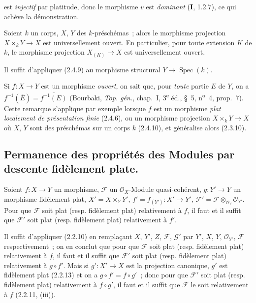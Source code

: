 est \emph{injectif} par platitude, donc le morphisme $v$ est \emph{dominant}
(\textbf{I}, 1.2.7), ce qui achève la démonstration.

\begin{corollary}[2.4.10]
\label{IV.2.4.10-fr}
Soient $k$ un corps, $X$, $Y$ des $k$-préschémas~; alors le morphisme
projection $X\times_k Y\to X$ est universellement ouvert. En particulier,
pour toute extension $K$ de $k$, le morphisme projection $X_{(K)}\to X$ est
universellement ouvert.
\end{corollary}

Il suffit d'appliquer (2.4.9) au morphisme structural
$Y\to\operatorname{Spec}(k)$.

\begin{remark}[2.4.11]
\label{IV.2.4.11-fr}
Si $f:X\to Y$ est un morphisme \emph{ouvert}, on sait que, pour \emph{toute} partie
$E$ de $Y$, on a
$f^{-1}(\overline E)=\overline{f^{-1}(E)}$
(Bourbaki, \emph{Top. gén.}, chap.~I, 3\textsuperscript{e} éd., \S~5,
n\textsuperscript{o}~4, prop.~7). Cette remarque s'applique par exemple
lorsque $f$ est un morphisme \emph{plat localement de présentation finie}
(2.4.6), ou un morphisme projection $X\times_k Y\to X$ où $X$, $Y$ sont des
préschémas sur un corps $k$ (2.4.10), et généralise alors (2.3.10).
\end{remark}

\subsection{Permanence des propriétés des Modules par descente fidèlement plate.}

\begin{proposition}[2.5.1]
\label{IV.2.5.1-fr}
Soient $f:X\to Y$ un morphisme, $\mathscr F$ un $\mathcal O_X$-Module
quasi-cohérent, $g:Y'\to Y$ un morphisme fidèlement plat,
$X'=X\times_Y Y'$, $f'=f_{(Y')}:X'\to Y'$,
$\mathscr F'=\mathscr F\otimes_{\mathcal O_Y}\mathcal O_{Y'}$. Pour que
$\mathscr F$ soit plat \textup{(resp.} fidèlement plat) relativement à $f$, il faut et
il suffit que $\mathscr F'$ soit plat \textup{(resp.} fidèlement plat) relativement à
$f'$.
\end{proposition}

Il suffit d'appliquer (2.2.10) en remplaçant $X$, $Y'$, $Z$, $\mathscr F$,
$\mathscr G'$ par $Y'$, $X$, $Y$, $\mathcal O_{Y'}$, $\mathscr F$
respectivement~; on en conclut que pour que $\mathscr F$ soit plat (resp.
fidèlement plat) relativement à $f$, il faut et il suffit que $\mathscr F'$
soit plat (resp. fidèlement plat) relativement à $g\circ f'$. Mais si
$g':X'\to X$ est la projection canonique, $g'$ est fidèlement plat (2.2.13)
et on a $g\circ f'=f\circ g'$~; donc pour que $\mathscr F'$ soit plat (resp.
fidèlement plat) relativement à $f\circ g'$, il faut et il suffit que
$\mathscr F$ le soit relativement à $f$ (2.2.11, (iii)).

